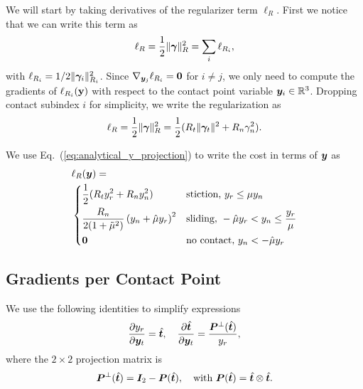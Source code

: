 We will start by taking derivatives of the regularizer term $\ell_R$. First we
notice that we can write this term as
\begin{equation*}
	\ell_R = \frac{1}{2}\Vert{\bm\gamma}\Vert_{R}^2 = 
	\sum_i \ell_{R_i},
\end{equation*}
with $\ell_{R_i}=1/2\Vert{\bm\gamma}_i\Vert_{R_i}^2$. Since
$\nabla_{{\bm{y}}_j}\ell_{R_i}={\bm{0}}$ for $i\neq j$, we only need to compute the
gradients of $\ell_{R_i}({\mathbf{y}})$ with respect to the contact point variable
${\bm{y}}_i\in\mathbb{R}^3$. Dropping contact subindex $i$ for simplicity, we
write the regularization as
\begin{eqnarray*}
	\ell_R = \frac{1}{2}\Vert{\bm\gamma}\Vert_R^2=\frac{1}{2}(R_t\Vert{\bm\gamma}_t\Vert^2+R_n\gamma_n^2).
\end{eqnarray*}

We use Eq.~(\ref{eq:analytical_y_projection}) to write the cost in terms of ${\bm{y}}$ as
\begin{align}
	&\ell_R(\vf{y}) = 
	\label{eq:ell_R_piecewise}\\	
&\begin{dcases}
	\frac{1}{2}(R_t y_r^2+R_n y_n^2) & \text{stiction, } y_r \le \mu y_n\\
	\frac{R_n}{2(1+\tilde\mu^2)}\left(y_n + \hat\mu y_r\right)^2 & \text{sliding, } -\hat\mu y_r < y_n \leq \frac{y_r}{\mu}\\
    \vf{0} & \text{no contact, } y_n < -\hat\mu y_r
\end{dcases}\nonumber	
\end{align}

\subsection{Gradients per Contact Point}
We use the following identities to simplify expressions
\begin{equation*}
	\frac{\partial y_r}{\partial{\bm{y}}_t} = \hat{{\bm{t}}}\nonumber,
	\quad
	\frac{\partial \hat{{\bm{t}}}}{\partial{\bm{y}}_t} =
	\frac{{\bm{P}}^\perp(\hat{{\bm{t}}})}{y_r},
\end{equation*}
where the $2\times 2$ projection matrix is
\begin{equation*}
	{\bm{P}}^\perp(\hat{{\bm{t}}})={\bm{I}}_2 - {\bm{P}}(\hat{{\bm{t}}}),
	\quad\text{with }
	{\bm{P}}(\hat{{\bm{t}}}) = \hat{{\bm{t}}}\otimes\hat{{\bm{t}}}\nonumber.
\end{equation*}

